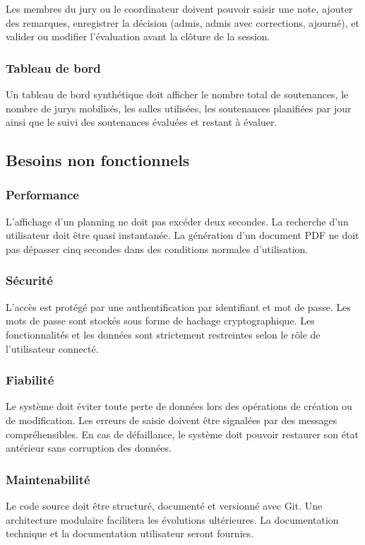 \documentclass[12pt,a4paper]{article}
\begin{document}
Les membres du jury ou le coordinateur doivent pouvoir saisir une note, ajouter
des remarques, enregistrer la décision (admis, admis avec corrections, ajourné),
et valider ou modifier l'évaluation avant la clôture de la session.

\subsubsection{Tableau de bord}
\label{subsubsec:tableau_de_bord}

Un tableau de bord synthétique doit afficher le nombre total de soutenances, le
nombre de jurys mobilisés, les salles utilisées, les soutenances planifiées par
jour ainsi que le suivi des soutenances évaluées et restant à évaluer.

\subsection{Besoins non fonctionnels}
\label{subsec:besoins_non_fonctionnels}

\subsubsection{Performance}
L'affichage d'un planning ne doit pas excéder deux secondes. La recherche d'un
utilisateur doit être quasi instantanée. La génération d'un document PDF ne doit
pas dépasser cinq secondes dans des conditions normales d'utilisation.

\subsubsection{Sécurité}
L'accès est protégé par une authentification par identifiant et mot de passe. Les
mots de passe sont stockés sous forme de hachage cryptographique. Les
fonctionnalités et les données sont strictement restreintes selon le rôle de
l'utilisateur connecté.

\subsubsection{Fiabilité}
Le système doit éviter toute perte de données lors des opérations de création ou
de modification. Les erreurs de saisie doivent être signalées par des messages
compréhensibles. En cas de défaillance, le système doit pouvoir restaurer son
état antérieur sans corruption des données.

\subsubsection{Maintenabilité}
Le code source doit être structuré, documenté et versionné avec Git. Une
architecture modulaire facilitera les évolutions ultérieures. La documentation
technique et la documentation utilisateur seront fournies.
\end{document}
